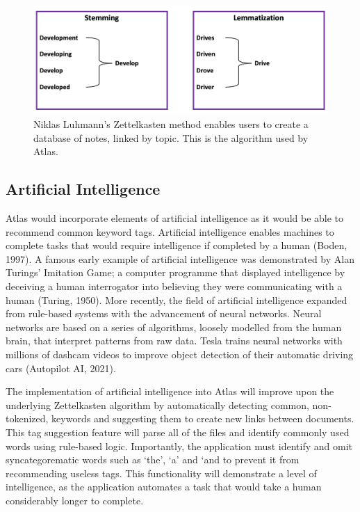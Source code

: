 \documentclass{article}
\begin{document}
\begin{figure}[!htb]
  \centering
      \includegraphics[width=1\textwidth]{images/litreview-nlp.png}
  \caption{Niklas Luhmann’s Zettelkasten method enables users to create a database of notes, linked by topic. This is the algorithm used by Atlas.}
\end{figure}

\subsection{Artificial Intelligence}

Atlas would incorporate elements of artificial intelligence as it would be able to recommend common keyword tags. Artificial intelligence enables machines to complete tasks that would require intelligence if completed by a human (Boden, 1997). A famous early example of artificial intelligence was demonstrated by Alan Turings' Imitation Game; a computer programme that displayed intelligence by deceiving a human interrogator into believing they were communicating with a human (Turing, 1950). More recently, the field of artificial intelligence expanded from rule-based systems with the advancement of neural networks. Neural networks are based on a series of algorithms, loosely modelled from the human brain, that interpret patterns from raw data. Tesla trains neural networks with millions of dashcam videos to improve object detection of their automatic driving cars (Autopilot AI, 2021).

The implementation of artificial intelligence into Atlas will improve upon the underlying Zettelkasten algorithm by automatically detecting common, non-tokenized, keywords and suggesting them to create new links between documents. This tag suggestion feature will parse all of the files and identify commonly used words using rule-based logic. Importantly, the application must identify and omit syncategorematic words such as ‘the’, ‘a’ and ‘and to prevent it from recommending useless tags. This functionality will demonstrate a level of intelligence, as the application automates a task that would take a human considerably longer to complete.
\end{document}
